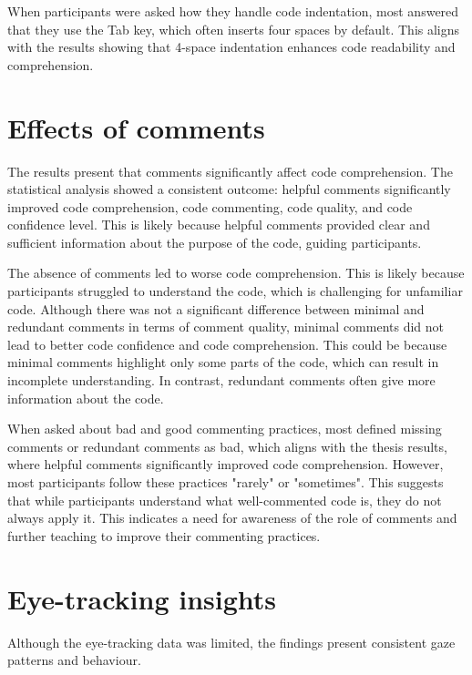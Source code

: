 When participants were asked how they handle code indentation, most answered that they use the Tab key, which often inserts four spaces by default.  This aligns with the results showing that 4-space indentation enhances code readability and comprehension. 

\section{Effects of comments} 
The results present that comments significantly affect code comprehension. The statistical analysis showed a consistent outcome: helpful comments significantly improved code comprehension, code commenting, code quality, and code confidence level. This is likely because helpful comments provided clear and sufficient information about the purpose of the code, guiding participants. 

The absence of comments led to worse code comprehension. This is likely because participants struggled to understand the code, which is challenging for unfamiliar code. Although there was not a significant difference between minimal and redundant comments in terms of comment quality, minimal comments did not lead to better code confidence and code comprehension. This could be because minimal comments highlight only some parts of the code,  which can result in incomplete understanding. In contrast, redundant comments often give more information about the code.   
 

When asked about bad and good commenting practices, most defined missing comments or redundant comments as bad, which aligns with the thesis results, where helpful comments significantly improved code comprehension. However, most participants follow these practices "rarely" or "sometimes". This suggests that while participants understand what well-commented code is, they do not always apply it. This indicates a need for awareness of the role of comments and further teaching to improve their commenting practices.  



\section{Eye-tracking insights} 
Although the eye-tracking data was limited, the findings present consistent gaze patterns and behaviour. 

